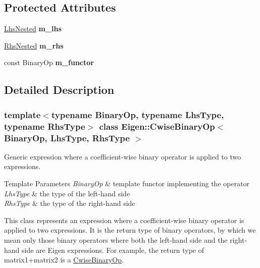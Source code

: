 \subsection*{Protected Attributes}
\begin{DoxyCompactItemize}
\item 
\mbox{\label{class_eigen_1_1_cwise_binary_op_a29b57054a3644d62c101ee15815ebe1c}} 
\mbox{\hyperlink{struct_eigen_1_1internal_1_1true__type}{Lhs\+Nested}} {\bfseries m\+\_\+lhs}
\item 
\mbox{\label{class_eigen_1_1_cwise_binary_op_a42af8f795a8f4062d9e57c0136277be3}} 
\mbox{\hyperlink{struct_eigen_1_1internal_1_1true__type}{Rhs\+Nested}} {\bfseries m\+\_\+rhs}
\item 
\mbox{\label{class_eigen_1_1_cwise_binary_op_a1bd1d4ffcfa797bb07b09b55e63bc9ab}} 
const Binary\+Op {\bfseries m\+\_\+functor}
\end{DoxyCompactItemize}


\subsection{Detailed Description}
\subsubsection*{template$<$typename Binary\+Op, typename Lhs\+Type, typename Rhs\+Type$>$\newline
class Eigen\+::\+Cwise\+Binary\+Op$<$ Binary\+Op, Lhs\+Type, Rhs\+Type $>$}

Generic expression where a coefficient-\/wise binary operator is applied to two expressions. 


\begin{DoxyTemplParams}{Template Parameters}
{\em Binary\+Op} & template functor implementing the operator \\
\hline
{\em Lhs\+Type} & the type of the left-\/hand side \\
\hline
{\em Rhs\+Type} & the type of the right-\/hand side\\
\hline
\end{DoxyTemplParams}
This class represents an expression where a coefficient-\/wise binary operator is applied to two expressions. It is the return type of binary operators, by which we mean only those binary operators where both the left-\/hand side and the right-\/hand side are Eigen expressions. For example, the return type of matrix1+matrix2 is a \mbox{\hyperlink{class_eigen_1_1_cwise_binary_op}{Cwise\+Binary\+Op}}.

